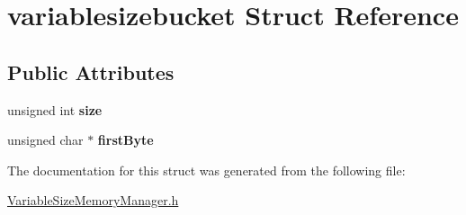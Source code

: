\hypertarget{structvariablesizebucket}{\section{variablesizebucket \-Struct \-Reference}
\label{structvariablesizebucket}
}
\subsection*{\-Public \-Attributes}
\begin{DoxyCompactItemize}
\item 
\hypertarget{structvariablesizebucket_ad7a85039ddabc439eba67e788fc2abbb}{unsigned int {\bfseries size}}\label{structvariablesizebucket_ad7a85039ddabc439eba67e788fc2abbb}

\item 
\hypertarget{structvariablesizebucket_a33316284b599a5e61a2735725073c019}{unsigned char $\ast$ {\bfseries first\-Byte}}\label{structvariablesizebucket_a33316284b599a5e61a2735725073c019}

\end{DoxyCompactItemize}


\-The documentation for this struct was generated from the following file\-:\begin{DoxyCompactItemize}
\item 
\hyperlink{VariableSizeMemoryManager_8h}{\-Variable\-Size\-Memory\-Manager.\-h}\end{DoxyCompactItemize}
